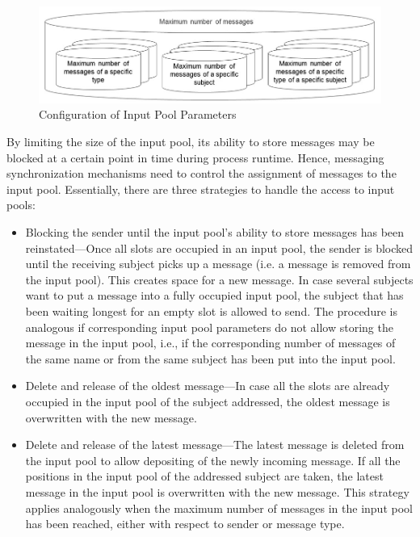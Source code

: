 \begin{figure}[htbp]
	\centering
	\includegraphics[width=12cm]{20181026-Ontologie-Bilder/Grafiken-Ontologie/SUbject-Interaction/input-pool-informal.jpg}
	\caption[Input Pool]{Configuration of Input Pool Parameters}
	\label{fig:input-pool}
\end{figure}

By limiting the size of the input pool, its ability to store messages may be blocked at a certain point in time during process runtime. Hence, messaging synchronization mechanisms need to control the assignment of messages to the input pool. Essentially, there are three strategies to handle the access to input pools:

\begin{itemize}
	\item Blocking the sender until the input pool’s ability to store messages has been reinstated---Once all slots are occupied in an input pool, the sender is blocked until the receiving subject picks up a message (i.e. a message is removed from the input pool). This creates space for a new message. In case several subjects want to put a message into a fully occupied input pool, the subject that has been waiting longest for an empty slot is allowed to send. The procedure is analogous if corresponding input pool parameters do not allow storing the message in the input pool, i.e., if the corresponding number of messages of the same name or from the same subject has been put into the input pool.
	\item Delete and release of the oldest message---In case all the slots are already occupied in the input pool of the subject addressed, the oldest message is overwritten with the new message.
	\item Delete and release of the latest message---The latest message is deleted from the input pool to allow depositing of the newly incoming message. If all the positions in the input pool of the addressed subject are taken, the latest message in the input pool is overwritten with the new message. This strategy applies analogously when the maximum number of messages in the input pool has been reached, either with respect to sender or message type.
\end{itemize}

